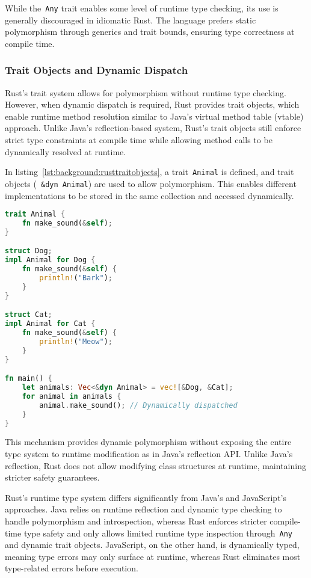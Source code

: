 While the~\lstinline|Any| trait enables some level of runtime type checking, its use is generally discouraged in idiomatic Rust. The language prefers static polymorphism through generics and trait bounds, ensuring type correctness at compile time.

\subsubsection{Trait Objects and Dynamic Dispatch}

Rust’s trait system allows for polymorphism without runtime type checking. However, when dynamic dispatch is required, Rust provides trait objects, which enable runtime method resolution similar to Java’s virtual method table (vtable) approach. Unlike Java’s reflection-based system, Rust’s trait objects still enforce strict type constraints at compile time while allowing method calls to be dynamically resolved at runtime.

In listing~\ref{lst:background:rusttraitobjects}, a trait~\lstinline|Animal| is defined, and trait objects (~\lstinline|&dyn Animal|) are used to allow polymorphism. This enables different implementations to be stored in the same collection and accessed dynamically.

\begin{lstlisting}[language=Rust,caption=Trait objects and dynamic dispatch in Rust,label=lst:background:rusttraitobjects]
trait Animal {
	fn make_sound(&self);
}

struct Dog;
impl Animal for Dog {
	fn make_sound(&self) {
		println!("Bark");
	}
}

struct Cat;
impl Animal for Cat {
	fn make_sound(&self) {
		println!("Meow");
	}
}

fn main() {
	let animals: Vec<&dyn Animal> = vec![&Dog, &Cat];
	for animal in animals {
		animal.make_sound(); // Dynamically dispatched
	}
}
\end{lstlisting}

This mechanism provides dynamic polymorphism without exposing the entire type system to runtime modification as in Java’s reflection API. Unlike Java’s reflection, Rust does not allow modifying class structures at runtime, maintaining stricter safety guarantees.

Rust’s runtime type system differs significantly from Java’s and JavaScript’s approaches. Java relies on runtime reflection and dynamic type checking to handle polymorphism and introspection, whereas Rust enforces stricter compile-time type safety and only allows limited runtime type inspection through~\lstinline|Any| and dynamic trait objects. JavaScript, on the other hand, is dynamically typed, meaning type errors may only surface at runtime, whereas Rust eliminates most type-related errors before execution.


